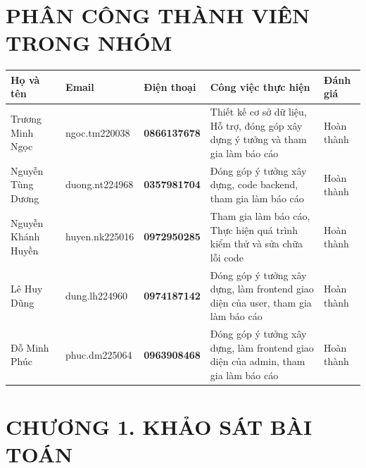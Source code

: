 \documentclass{article}
\begin{document}
\section*{PHÂN CÔNG THÀNH VIÊN TRONG NHÓM}
\begin{adjustwidth}{0cm}{1cm} %
\resizebox{\textwidth}{!}
{ %
\begin{tabular}{|p{2.5cm}|p{3.5cm}|p{3cm}|p{4.5cm}|p{2.5cm}|}
\hline
\textbf{Họ và tên} & \textbf{Email} & \textbf{Điện thoại} & \textbf{Công việc thực hiện} & \textbf{Đánh giá} \\ 
\hline
Trương Minh Ngọc & ngoc.tm220038 & \textbf{0866137678} & Thiết kế cơ sở dữ liệu, Hỗ trợ, đóng góp xây dựng ý tưởng và tham gia làm báo cáo & Hoàn thành \\ 
\hline
Nguyễn Tùng Dương & duong.nt224968 & \textbf{0357981704} & Đóng góp ý tưởng xây dựng, code backend, \newline tham gia làm báo cáo & Hoàn thành \\ 
\hline
Nguyễn Khánh Huyền & huyen.nk225016 & \textbf{0972950285} & Tham gia làm báo cáo, Thực hiện quá trình kiểm thử và sửa chữa lỗi code & Hoàn thành \\ 
\hline
Lê Huy Dũng & dung.lh224960 & \textbf{0974187142} & Đóng góp ý tưởng xây dựng, làm frontend giao diện của user, tham gia làm báo cáo & Hoàn thành \\ 
\hline
Đỗ Minh \newline Phúc & phuc.dm225064 & \textbf{0963908468} & Đóng góp ý tưởng xây dựng, làm frontend giao diện của admin, tham gia làm báo cáo & Hoàn thành \\ 
\hline
\end{tabular}
}
\end{adjustwidth}
\newpage

\section*{CHƯƠNG 1. KHẢO SÁT BÀI TOÁN}
\setcounter{section}{1}
\end{document}
